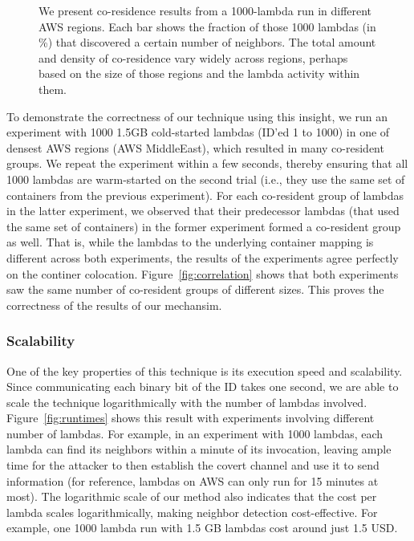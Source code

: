 \begin{figure}[!t]
\begin{subfigure}{.33\textwidth}
  \end{subfigure}
  \caption{We present co-residence results from a 1000-lambda run in different AWS regions. Each bar shows the fraction 
  of those 1000 lambdas (in \%) that discovered a certain number of neighbors. The total amount and density of co-residence 
  vary widely across regions, perhaps based on the size of those regions and the lambda activity within them. }
  \label{fig:awsregions}
  \end{figure}

To demonstrate the correctness of our technique using this insight, we run an
experiment with 1000 1.5GB cold-started lambdas (ID'ed 1 to 1000) in one of
densest AWS regions (AWS MiddleEast), which resulted in many co-resident groups.
We repeat the experiment within a few seconds, thereby ensuring that all 1000
lambdas are warm-started on the second trial (i.e., they use the same set of
containers from the previous experiment).  For each co-resident group of lambdas
in the latter experiment, we observed that their predecessor lambdas (that used
the same set of containers) in the former experiment formed a co-resident group
as well. That is, while the lambdas to the underlying container mapping is
different across both experiments, the results of the experiments agree
perfectly on the continer colocation. Figure~\ref{fig:correlation} shows that
both experiments saw the same number of co-resident groups of different sizes.
This proves the correctness of the results of our mechansim.

\subsubsection{Scalability}
One of the key properties of this technique is its execution speed and
scalability. Since communicating each binary bit of the ID takes one second, we
are able to scale the technique logarithmically with the number of lambdas
involved. Figure~\ref{fig:runtimes} shows this result with experiments
involving different number of lambdas. For example, in an experiment with 1000
lambdas, each lambda can find its neighbors within a minute of its invocation,
leaving ample time for the attacker to then establish the covert channel and use
it to send information (for reference, lambdas on AWS can only run for 15
minutes at most).  The logarithmic scale of our method also indicates that the
cost per lambda scales logarithmically, making neighbor detection
cost-effective.  For example, one 1000 lambda run with 1.5 GB lambdas cost
around just 1.5 USD. 



